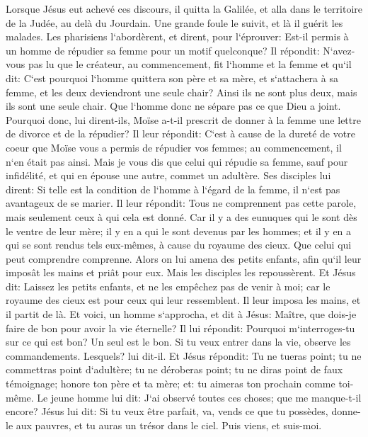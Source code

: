 \verse Lorsque Jésus eut achevé ces discours, il quitta la Galilée, et alla dans le territoire de la Judée, au delà du Jourdain. 
\verse Une grande foule le suivit, et là il guérit les malades. 
\verse Les pharisiens l`abordèrent, et dirent, pour l`éprouver: Est-il permis à un homme de répudier sa femme pour un motif quelconque? 
\verse Il répondit: N`avez-vous pas lu que le créateur, au commencement, fit l`homme et la femme 
\verse et qu`il dit: C`est pourquoi l`homme quittera son père et sa mère, et s`attachera à sa femme, et les deux deviendront une seule chair? 
\verse Ainsi ils ne sont plus deux, mais ils sont une seule chair. Que l`homme donc ne sépare pas ce que Dieu a joint. 
\verse Pourquoi donc, lui dirent-ils, Moïse a-t-il prescrit de donner à la femme une lettre de divorce et de la répudier? 
\verse Il leur répondit: C`est à cause de la dureté de votre coeur que Moïse vous a permis de répudier vos femmes; au commencement, il n`en était pas ainsi. 
\verse Mais je vous dis que celui qui répudie sa femme, sauf pour infidélité, et qui en épouse une autre, commet un adultère. 
\verse Ses disciples lui dirent: Si telle est la condition de l`homme à l`égard de la femme, il n`est pas avantageux de se marier. 
\verse Il leur répondit: Tous ne comprennent pas cette parole, mais seulement ceux à qui cela est donné. 
\verse Car il y a des eunuques qui le sont dès le ventre de leur mère; il y en a qui le sont devenus par les hommes; et il y en a qui se sont rendus tels eux-mêmes, à cause du royaume des cieux. Que celui qui peut comprendre comprenne. 
\verse Alors on lui amena des petits enfants, afin qu`il leur imposât les mains et priât pour eux. Mais les disciples les repoussèrent. 
\verse Et Jésus dit: Laissez les petits enfants, et ne les empêchez pas de venir à moi; car le royaume des cieux est pour ceux qui leur ressemblent. 
\verse Il leur imposa les mains, et il partit de là. 
\verse Et voici, un homme s`approcha, et dit à Jésus: Maître, que dois-je faire de bon pour avoir la vie éternelle? 
\verse Il lui répondit: Pourquoi m`interroges-tu sur ce qui est bon? Un seul est le bon. Si tu veux entrer dans la vie, observe les commandements. Lesquels? lui dit-il. 
\verse Et Jésus répondit: Tu ne tueras point; tu ne commettras point d`adultère; tu ne déroberas point; tu ne diras point de faux témoignage; honore ton père et ta mère; 
\verse et: tu aimeras ton prochain comme toi-même. 
\verse Le jeune homme lui dit: J`ai observé toutes ces choses; que me manque-t-il encore? 
\verse Jésus lui dit: Si tu veux être parfait, va, vends ce que tu possèdes, donne-le aux pauvres, et tu auras un trésor dans le ciel. Puis viens, et suis-moi. 
